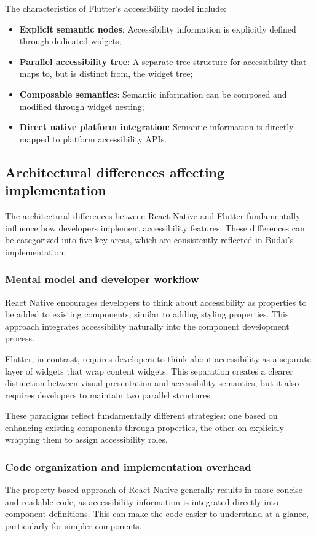 The characteristics of Flutter's accessibility model include:

\begin{itemize}
    \item \textbf{Explicit semantic nodes}: Accessibility information is explicitly defined through dedicated widgets;
    \item \textbf{Parallel accessibility tree}: A separate tree structure for accessibility that maps to, but is distinct from, the widget tree;
    \item \textbf{Composable semantics}: Semantic information can be composed and modified through widget nesting;
    \item \textbf{Direct native platform integration}: Semantic information is directly mapped to platform accessibility APIs.
\end{itemize}

\subsection{Architectural differences affecting implementation}
\label{subsec:arch-differences}

The architectural differences between React Native and Flutter fundamentally influence how developers implement accessibility features. These differences can be categorized into five key areas, which are consistently reflected in Budai's implementation.

\subsubsection{Mental model and developer workflow}
React Native encourages developers to think about accessibility as properties to be added to existing components, similar to adding styling properties. This approach integrates accessibility naturally into the component development process.

Flutter, in contrast, requires developers to think about accessibility as a separate layer of widgets that wrap content widgets. This separation creates a clearer distinction between visual presentation and accessibility semantics, but it also requires developers to maintain two parallel structures.

These paradigms reflect fundamentally different strategies: one based on enhancing existing components through properties, the other on explicitly wrapping them to assign accessibility roles.

\subsubsection{Code organization and implementation overhead}
The property-based approach of React Native generally results in more concise and readable code, as accessibility information is integrated directly into component definitions. This can make the code easier to understand at a glance, particularly for simpler components.

